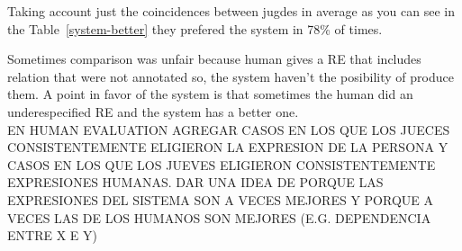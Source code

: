 Taking account just the coincidences between jugdes in average as you can see in the Table~\ref{system-better} they prefered the system in 78\% of times.

Sometimes comparison was unfair because human gives a RE that includes relation that were not annotated so, the system haven't the posibility of produce them. A point in favor of the system is that sometimes the human did an underespecified RE and the system has a better one.\\

EN HUMAN EVALUATION AGREGAR CASOS EN LOS QUE LOS JUECES CONSISTENTEMENTE ELIGIERON LA EXPRESION DE LA PERSONA Y CASOS EN LOS QUE LOS JUEVES ELIGIERON CONSISTENTEMENTE EXPRESIONES HUMANAS. DAR UNA IDEA DE PORQUE LAS EXPRESIONES DEL SISTEMA SON A VECES MEJORES Y PORQUE A VECES LAS DE LOS HUMANOS SON MEJORES (E.G. DEPENDENCIA ENTRE X E Y)

